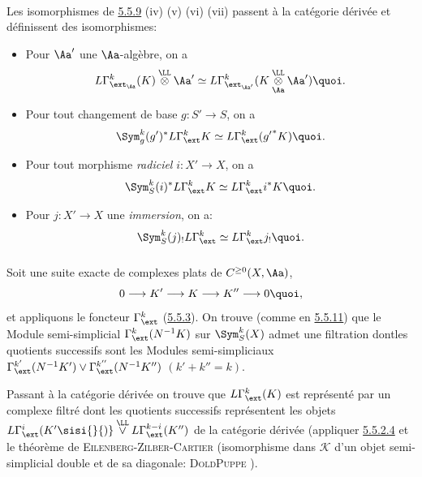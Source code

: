 \documentclass[10pt]{../fichiers-configuration-latex/smfart}
\begin{document}
\paragraph{}
Les isomorphismes de \hyperref[XVII.subsubsec5.5.9]{5.5.9} (iv) (v) (vi) (vii)
passent à la catégorie dérivée et définissent des isomorphismes:
\begin{itemize}
\item[${\rm(iv')}$] Pour $\Aa'$ une $\Aa$-algèbre, on a
$$
L\Gamma^{k}_{\ext_{\Aa}}(K)\overset{\LL}{\otimes}
\Aa'\simeq
L\Gamma^{k}_{\ext_{\Aa'}}(K\overset{\LL}{\underset{\Aa}{\otimes}}\Aa'){\quoi}.
$$

\item[${\rm(v')}$] Pour tout changement de base $g:S'\rightarrow S$,
on a
$$
\Sym^{k}_{g}(g')^{\ast}L\Gamma^{k}_{\ext}K\simeq
L\Gamma^{k}_{\ext}({g'}^{\ast}K){\quoi}.
$$

\item[${\rm (vi')}$] Pour tout morphisme \emph{radiciel}
$i:X'\rightarrow X$, on a
$$
\Sym^{k}_{S}(i)^{\ast}L\Gamma^{k}_{\ext}K\simeq
L\Gamma^{k}_{\ext}i^{\ast}K{\quoi}.
$$

\item[${\rm (vii')}$] Pour $j:X'\rightarrow X$ une \emph{immersion},
on a:
$$
\Sym^{k}_{S}(j)_{!} L\Gamma^{k}_{\ext}\simeq
L\Gamma^{k}_{\ext}j_{!}{\quoi}.
$$
\end{itemize}

\subsubsection{}
Soit une suite exacte de complexes plats de $C^{\geq
0}(X,\Aa)$,
$$
0\longrightarrow K'\longrightarrow K\longrightarrow K''\longrightarrow
0{\quoi},
$$
et appliquons le foncteur $\Gamma^{k}_{\ext}$
(\hyperref[XVII.subsubsec5.5.3]{5.5.3}). On trouve
(comme en \hyperref[XVII.subsubsec5.5.11]{5.5.11}) que le Module semi-simplicial
$\Gamma^{k}_{\ext}(N^{-1}K)$ sur $\Sym^{k}_{S}(X)$ admet une
filtration dont\pageoriginale les quotients successifs sont les
Modules semi-simpliciaux $\Gamma^{k'}_{\ext}(N^{-1}K')\vee
\Gamma^{k''}_{\ext}(N^{-1}K'')$ $(k'+k''=k)$.

Passant à la catégorie dérivée on trouve que $L\Gamma^{k}_{\ext}(K)$
est représenté par un complexe filtré dont les quotients successifs
représentent les objets
$L\Gamma^{i}_{\ext}(K'\sisi{}{)}\overset{\LL}{\vee}L\Gamma^{k-i}_{\ext}
(K'')$ de la catégorie dérivée (appliquer \hyperref[XVII.par5.5.2.4]{5.5.2.4} et le
théorème de
\textsc{Eilenberg-Zilber-Cartier} (isomorphisme dans $\mathcal{K}$ d'un objet
semi-simplicial double et de sa diagonale: \textsc{Dold\sisi{ }{-}Puppe} \cite[2.9 ]{SGA4-17:DP}).
\end{document}
